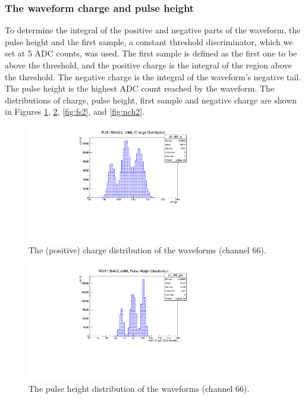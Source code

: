 \subsubsection{The waveform charge and pulse height}\label{threshold}
To determine the integral of the positive and negative 
parts of the waveform, the pulse height and the first 
sample, a constant threshold discriminator, which we 
set at 5 ADC counts, was used. 
The first sample is defined as the first 
one to be above the threshold, 
and the positive charge 
is the integral of the region above the 
threshold. The negative charge 
is the integral of the waveform's 
negative tail. The pulse height is the 
highest ADC count reached 
by the waveform. The distributions of 
charge, pulse height, first sample and negative charge 
are shown in Figures \ref{fig:ch1}, \ref{fig:ph2}, \ref{fig:fs2}, 
and \ref{fig:nch2}.

\begin{figure}[!h]
      \centering
      \includegraphics[width=0.65\textwidth]{figures/pdf/charge.pdf}
      \caption[The (positive) charge distribution of the waveforms.]{The (positive) charge distribution of the waveforms (channel 66).}
      \label{fig:ch1}
  \end{figure}

\begin{figure}[!h]
  \centering
  \includegraphics[width=0.65\textwidth]{figures/pdf/pulseheight.pdf}
  \caption[The pulse height distribution of the waveforms.]{The pulse height distribution of the waveforms (channel 66).}
  \label{fig:ph2}
\end{figure}

